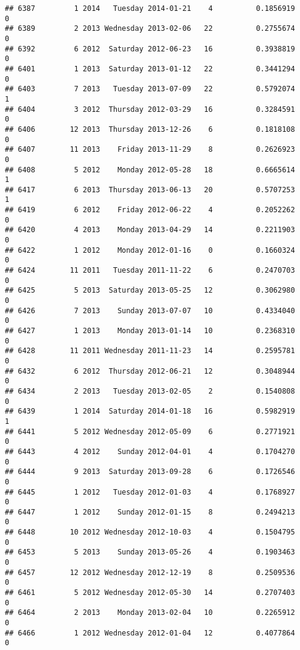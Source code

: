 \documentclass[
]{article}
\begin{document}
\begin{verbatim}
## 6387         1 2014   Tuesday 2014-01-21    4          0.1856919             0
## 6389         2 2013 Wednesday 2013-02-06   22          0.2755674             0
## 6392         6 2012  Saturday 2012-06-23   16          0.3938819             0
## 6401         1 2013  Saturday 2013-01-12   22          0.3441294             0
## 6403         7 2013   Tuesday 2013-07-09   22          0.5792074             1
## 6404         3 2012  Thursday 2012-03-29   16          0.3284591             0
## 6406        12 2013  Thursday 2013-12-26    6          0.1818108             0
## 6407        11 2013    Friday 2013-11-29    8          0.2626923             0
## 6408         5 2012    Monday 2012-05-28   18          0.6665614             1
## 6417         6 2013  Thursday 2013-06-13   20          0.5707253             1
## 6419         6 2012    Friday 2012-06-22    4          0.2052262             0
## 6420         4 2013    Monday 2013-04-29   14          0.2211903             0
## 6422         1 2012    Monday 2012-01-16    0          0.1660324             0
## 6424        11 2011   Tuesday 2011-11-22    6          0.2470703             0
## 6425         5 2013  Saturday 2013-05-25   12          0.3062980             0
## 6426         7 2013    Sunday 2013-07-07   10          0.4334040             0
## 6427         1 2013    Monday 2013-01-14   10          0.2368310             0
## 6428        11 2011 Wednesday 2011-11-23   14          0.2595781             0
## 6432         6 2012  Thursday 2012-06-21   12          0.3048944             0
## 6434         2 2013   Tuesday 2013-02-05    2          0.1540808             0
## 6439         1 2014  Saturday 2014-01-18   16          0.5982919             1
## 6441         5 2012 Wednesday 2012-05-09    6          0.2771921             0
## 6443         4 2012    Sunday 2012-04-01    4          0.1704270             0
## 6444         9 2013  Saturday 2013-09-28    6          0.1726546             0
## 6445         1 2012   Tuesday 2012-01-03    4          0.1768927             0
## 6447         1 2012    Sunday 2012-01-15    8          0.2494213             0
## 6448        10 2012 Wednesday 2012-10-03    4          0.1504795             0
## 6453         5 2013    Sunday 2013-05-26    4          0.1903463             0
## 6457        12 2012 Wednesday 2012-12-19    8          0.2509536             0
## 6461         5 2012 Wednesday 2012-05-30   14          0.2707403             0
## 6464         2 2013    Monday 2013-02-04   10          0.2265912             0
## 6466         1 2012 Wednesday 2012-01-04   12          0.4077864             0

\end{verbatim}
\end{document}
